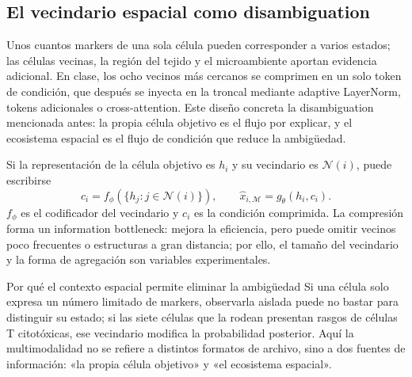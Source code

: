 \subsection{El vecindario espacial como disambiguation}

Unos cuantos markers de una sola célula pueden corresponder a varios estados; las células vecinas, la región del tejido y el microambiente aportan evidencia adicional. En clase, los ocho vecinos más cercanos se comprimen en un solo token de condición, que después se inyecta en la troncal mediante adaptive LayerNorm, tokens adicionales o cross-attention. Este diseño concreta la disambiguation mencionada antes: la propia célula objetivo es el flujo por explicar, y el ecosistema espacial es el flujo de condición que reduce la ambigüedad.


Si la representación de la célula objetivo es $h_i$ y su vecindario es $\mathcal{N}(i)$, puede escribirse
\[
c_i=f_\phi\!\left(\{h_j:j\in\mathcal{N}(i)\}\right),\qquad
\hat{x}_{i,\mathcal M}=g_\theta(h_i,c_i).
\]
$f_\phi$ es el codificador del vecindario y $c_i$ es la condición comprimida. La compresión forma un information bottleneck: mejora la eficiencia, pero puede omitir vecinos poco frecuentes o estructuras a gran distancia; por ello, el tamaño del vecindario y la forma de agregación son variables experimentales.


\begin{importantbox}{Por qué el contexto espacial permite eliminar la ambigüedad}
Si una célula solo expresa un número limitado de markers, observarla aislada puede no bastar para distinguir su estado; si las siete células que la rodean presentan rasgos de células T citotóxicas, ese vecindario modifica la probabilidad posterior. Aquí la multimodalidad no se refiere a distintos formatos de archivo, sino a dos fuentes de información: «la propia célula objetivo» y «el ecosistema espacial».
\end{importantbox}

